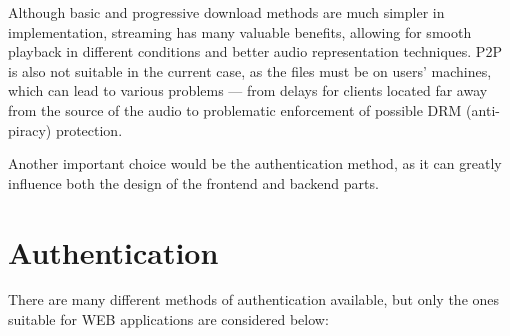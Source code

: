 Although basic and progressive download methods are much simpler in implementation,
streaming has many valuable benefits, allowing for smooth playback in different
conditions and better audio representation techniques. P2P is also not suitable
in the current case, as the files must be on users' machines, which can lead
to various problems — from delays for clients located far away from the source of the audio
to problematic enforcement of possible DRM (anti-piracy) protection.

Another important choice would be the authentication method, as it can greatly influence both
the design of the frontend and backend parts.


\section{Authentication}
There are many different methods of authentication available, but only the ones suitable for
WEB applications are considered below:
